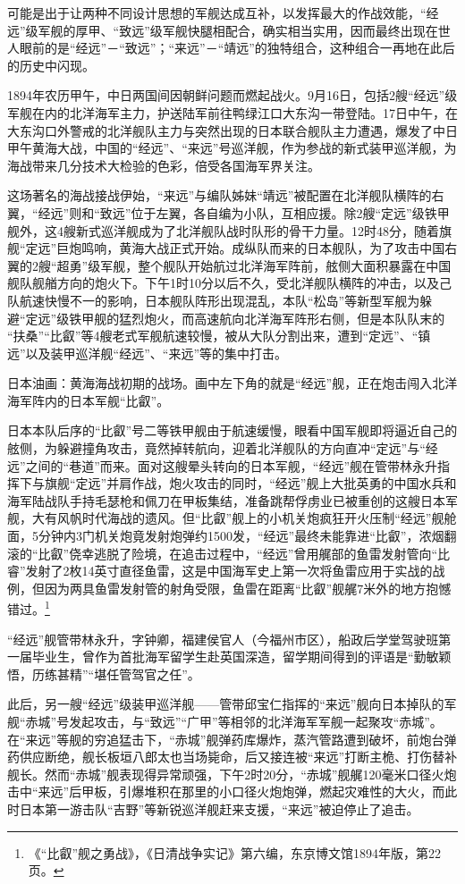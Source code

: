 \documentclass[12pt,UTF8]{ctexbook}
\begin{document}
可能是出于让两种不同设计思想的军舰达成互补，以发挥最大的作战效能，“经远”级军舰的厚甲、“致远”级军舰快腿相配合，确实相当实用，因而最终出现在世人眼前的是“经远”－“致远”；“来远”－“靖远”的独特组合，这种组合一再地在此后的历史中闪现。

1894年农历甲午，中日两国间因朝鲜问题而燃起战火。9月16日，包括2艘“经远”级军舰在内的北洋海军主力，护送陆军前往鸭绿江口大东沟一带登陆。17日中午，在大东沟口外警戒的北洋舰队主力与突然出现的日本联合舰队主力遭遇，爆发了中日甲午黄海大战，中国的“经远”、“来远”号巡洋舰，作为参战的新式装甲巡洋舰，为海战带来几分技术大检验的色彩，倍受各国海军界关注。

这场著名的海战接战伊始，“来远”与编队姊妹“靖远”被配置在北洋舰队横阵的右翼，“经远”则和“致远”位于左翼，各自编为小队，互相应援。除2艘“定远”级铁甲舰外，这4艘新式巡洋舰成为了北洋舰队战时队形的骨干力量。12时48分，随着旗舰“定远”巨炮鸣响，黄海大战正式开始。成纵队而来的日本舰队，为了攻击中国右翼的2艘“超勇”级军舰，整个舰队开始航过北洋海军阵前，舷侧大面积暴露在中国舰队舰艏方向的炮火下。下午1时10分以后不久，受北洋舰队横阵的冲击，以及己队航速快慢不一的影响，日本舰队阵形出现混乱，本队“松岛”等新型军舰为躲避“定远”级铁甲舰的猛烈炮火，而高速航向北洋海军阵形右侧，但是本队队末的 “扶桑”“比叡”等4艘老式军舰航速较慢，被从大队分割出来，遭到“定远”、“镇远”以及装甲巡洋舰“经远”、“来远”等的集中打击。

日本油画：黄海海战初期的战场。画中左下角的就是“经远”舰，正在炮击闯入北洋海军阵内的日本军舰“比叡”。

日本本队后序的“比叡”号二等铁甲舰由于航速缓慢，眼看中国军舰即将逼近自己的舷侧，为躲避撞角攻击，竟然掉转航向，迎着北洋舰队的方向直冲“定远”与“经远”之间的“巷道”而来。面对这艘晕头转向的日本军舰，“经远”舰在管带林永升指挥下与旗舰“定远”并肩作战，炮火攻击的同时，“经远”舰上大批英勇的中国水兵和海军陆战队手持毛瑟枪和佩刀在甲板集结，准备跳帮俘虏业已被重创的这艘日本军舰，大有风帆时代海战的遗风。但“比叡”舰上的小机关炮疯狂开火压制“经远”舰舱面，5分钟内3门机关炮竟发射炮弹约1500发，“经远”最终未能靠进“比叡”，浓烟翻滚的“比叡”侥幸逃脱了险境，在追击过程中，“经远”曾用艉部的鱼雷发射管向“比睿”发射了2枚14英寸直径鱼雷，这是中国海军史上第一次将鱼雷应用于实战的战例，但因为两具鱼雷发射管的射角受限，鱼雷在距离“比叡”舰艉7米外的地方抱憾错过。\footnote{《“比叡”舰之勇战》，《日清战争实记》第六编，东京博文馆1894年版，第22页。}

“经远”舰管带林永升，字钟卿，福建侯官人（今福州市区），船政后学堂驾驶班第一届毕业生，曾作为首批海军留学生赴英国深造，留学期间得到的评语是“勤敏颖悟，历练甚精”“堪任管驾官之任”。

此后，另一艘“经远”级装甲巡洋舰——管带邱宝仁指挥的“来远”舰向日本掉队的军舰“赤城”号发起攻击，与“致远”“广甲”等相邻的北洋海军军舰一起聚攻“赤城”。在“来远”等舰的穷追猛击下，“赤城”舰弹药库爆炸，蒸汽管路遭到破坏，前炮台弹药供应断绝，舰长板垣八郎太也当场毙命，后又接连被“来远”打断主桅、打伤替补舰长。然而“赤城”舰表现得异常顽强，下午2时20分，“赤城”舰艉120毫米口径火炮击中“来远”后甲板，引爆堆积在那里的小口径火炮炮弹，燃起灾难性的大火，而此时日本第一游击队“吉野”等新锐巡洋舰赶来支援，“来远”被迫停止了追击。
\end{document}
